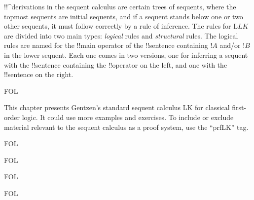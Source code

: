 \documentclass[10pt,a4paper]{article}
\theoremstyle{plain}
\theoremstyle{definition}
\theoremstyle{remark}
\newenvironment{editorial}{}{}
\newcommand*{\olchapter}[3]{}
\newcommand*{\olimport}[1]{}
\providecommand{\Log}{\ensuremath{\mathrm{L}}}
\providecommand{\iftag}[1]{#1}
\begin{document}
!!^{derivation}s in the sequent calculus are certain trees of
sequents, where the topmost sequents are initial sequents, and if a
sequent stands below one or two other sequents, it must follow
correctly by a rule of inference.  The rules for $\Log{LK}$ are
divided into two main types: \emph{logical} rules and
\emph{structural} rules.  The logical rules are named for the !!{main
  operator} of the !!{sentence} containing $!A$ and/or $!B$ in the
lower sequent. Each one comes in two versions, one for inferring a
sequent with the !!{sentence} containing the !!{operator} on the left,
and one with the !!{sentence} on the right.





\iftag{FOL}
      {\olchapter{fol}{seq}{The Sequent Calculus}}
      {\olchapter{pl}{seq}{The Sequent Calculus}}

\begin{editorial}
  This chapter presents Gentzen's standard sequent calculus LK for
  classical first-order logic.  It could use more examples and
  exercises. To include or exclude material relevant to the sequent
  calculus as a proof system, use the ``prfLK'' tag.
\end{editorial}

\olimport{rules-and-proofs}

\olimport{propositional-rules}

\iftag{FOL}{%
  \olimport{quantifier-rules}
}{}

\olimport{structural-rules}

\olimport{derivations}

\olimport{proving-things}

\iftag{FOL}{%
  \olimport{proving-things-quant}
}{}

\olimport{proof-theoretic-notions}

\olimport{provability-consistency}

\olimport{provability-propositional}

\iftag{FOL}{%
  \olimport{provability-quantifiers}
}{}

\olimport{soundness}

\iftag{FOL}{%
  \olimport{identity}
  \olimport{soundness-identity}
}{}

\OLEndChapterHook


\end{document}
